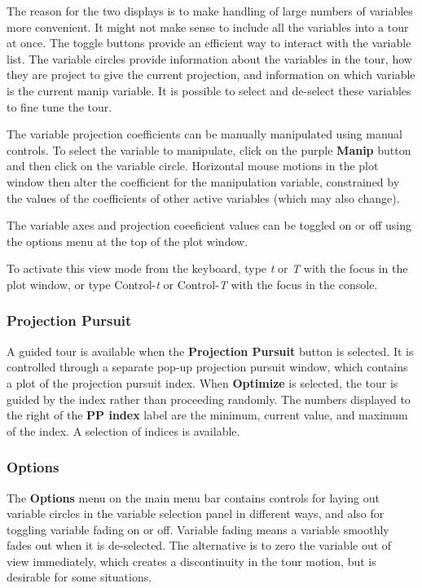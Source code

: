 \documentclass[11pt]{article}
\begin{document}
The reason for the two displays is to make handling of large numbers
of variables more convenient. It might not make sense to include all
the variables into a tour at once. The toggle buttons provide an
efficient way to interact with the variable list. The variable circles
provide information about the variables in the tour, how they are
project to give the current projection, and information on which
variable is the current manip variable. It is possible to select and
de-select these variables to fine tune the tour. 

The variable projection coefficients can be manually manipulated
using manual controls. To select the variable to manipulate, click on
the purple {\bf Manip} button and then click on the variable circle.
Horizontal mouse motions in the plot window then alter the coefficient for
the manipulation variable, constrained by the values of the coefficients
of other active variables (which may also change).

The variable axes and projection coeeficient values can be toggled on
or off using the options menu at the top of the plot window.

To activate this view mode from the keyboard, type {\em t} or {\em T}
with the focus in the plot window, or type Control-{\em t} or
Control-{\em T} with the focus in the console.

\subsubsection{Projection Pursuit}

A guided tour is available when the {\bf Projection Pursuit} button is
selected. It is controlled through a separate pop-up projection
pursuit window, which contains a plot of the projection pursuit index.
When {\bf Optimize} is selected, the tour is guided by the index
rather than proceeding randomly.  The numbers displayed to the right
of the {\bf PP index} label are the minimum, current value, and
maximum of the index.  A selection of indices is available.

\subsubsection{Options}

The {\bf Options} menu on the main menu bar contains controls for
laying out variable circles in the variable selection panel in
different ways, and also for toggling variable fading on or
off. Variable fading means a variable smoothly fades out when it is
de-selected. The alternative is to zero the variable out of view
immediately, which creates a discontinuity in the tour motion, but is
desirable for some situations.
\end{document}
